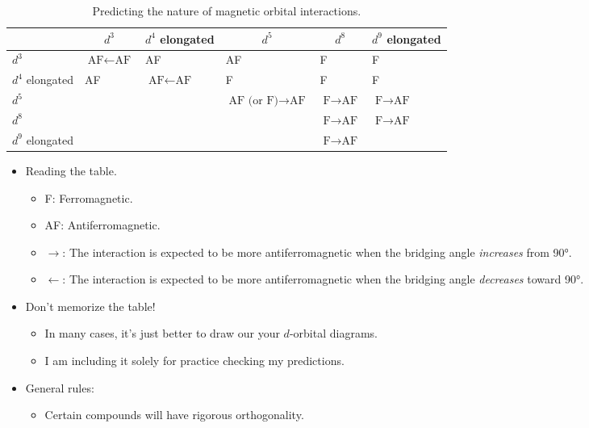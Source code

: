 \documentclass[../notes.tex]{subfiles}
\begin{document}
\begin{itemize}
\begin{table}[H]
        \small
        \renewcommand{\arraystretch}{1.2}
        \begin{tabular}{llllll}
            \hline
            & \multicolumn{1}{c}{$d^3$} & \multicolumn{1}{c}{$d^4$ elongated} & \multicolumn{1}{c}{$d^5$} & \multicolumn{1}{c}{$d^8$} & \multicolumn{1}{c}{$d^9$ elongated}\\
            \hline
            $d^3$ & $\text{AF}\leftarrow\text{AF}$ & AF & AF & F & F\\
            $d^4$ elongated & AF & $\text{AF}\leftarrow\text{AF}$ & F & F & F\\
            $d^5$ & & & $\text{AF (or F)}\to\text{AF}$ & $\text{F}\to\text{AF}$ & $\text{F}\to\text{AF}$\\
            $d^8$ & & & & $\text{F}\to\text{AF}$ & $\text{F}\to\text{AF}$\\
            $d^9$ elongated & & & & $\text{F}\to\text{AF}$ & \\
            \hline
        \end{tabular}
        \caption{Predicting the nature of magnetic orbital interactions.}
        \label{tab:magOrbInteract}
    \end{table}
    \begin{itemize}
        \item Reading the table.
        \begin{itemize}
            \item F: Ferromagnetic.
            \item AF: Antiferromagnetic.
            \item $\to$: The interaction is expected to be more antiferromagnetic when the bridging angle \emph{increases} from \ang{90}.
            \item $\leftarrow$: The interaction is expected to be more antiferromagnetic when the bridging angle \emph{decreases} toward \ang{90}.
        \end{itemize}
        \item Don't memorize the table!
        \begin{itemize}
            \item In many cases, it's just better to draw our your $d$-orbital diagrams.
            \item I am including it solely for practice checking my predictions.
        \end{itemize}
        \item General rules:
        \begin{itemize}
            \item Certain compounds will have rigorous orthogonality.

\end{itemize}
\end{itemize}
\end{itemize}
\end{document}
